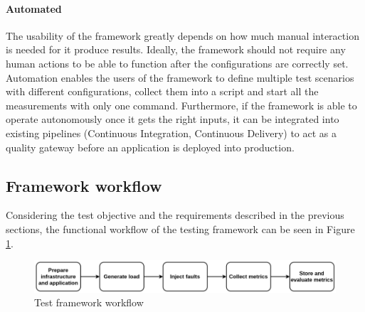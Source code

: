 \paragraph{Automated} The usability of the framework greatly depends on how much manual interaction is needed for it produce results. Ideally, the framework should not require any human actions to be able to function after the configurations are correctly set. Automation enables the users of the framework to define multiple test scenarios with different configurations, collect them into a script and start all the measurements with only one command. Furthermore, if the framework is able to operate autonomously once it gets the right inputs, it can be integrated into existing pipelines (Continuous Integration, Continuous Delivery) to act as a quality gateway before an application is deployed into production.


\subsection{Framework workflow} \label{test-design-workflow}



Considering the test objective and the requirements described in the previous sections, the functional workflow of the testing framework can be seen in Figure \ref{fig:test_framework_workflow}.

\begin{figure}[h]
	\centering
	\includegraphics[width=140mm, keepaspectratio]{figures/test_framework_workflow.png}
	\caption{Test framework workflow}
	\label{fig:test_framework_workflow}
\end{figure}

